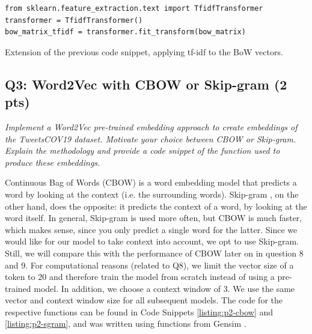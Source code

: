 \begin{listing*}
\begin{verbatim}
from sklearn.feature_extraction.text import TfidfTransformer
transformer = TfidfTransformer()
bow_matrix_tfidf = transformer.fit_transform(bow_matrix)
\end{verbatim}
\caption{Extension of the previous code snippet, applying tf-idf to the BoW vectors.}
\label{listing:p2-tfidf}
\end{listing*}

\subsection*{Q3: Word2Vec with CBOW or Skip-gram (2 pts)}
\textit{Implement a Word2Vec pre-trained embedding approach to create embeddings of the TweetsCOV19 dataset. Motivate your choice between CBOW or Skip-gram. Explain the methodology and provide a code snippet of the function used to produce these embeddings.}

Continuous Bag of Words (CBOW) \cite{cbowsgram} is a word embedding model that predicts a word by looking at the context (i.e. the surrounding words). Skip-gram \cite{cbowsgram}, on the other hand, does the opposite: it predicts the context of a word, by looking at the word itself. In general, Skip-gram is used more often, but CBOW is much faster, which makes sense, since you only predict a single word for the latter. Since we would like for our model to take context into account, we opt to use Skip-gram. Still, we will compare this with the performance of CBOW later on in question 8 and 9. For computational reasons (related to Q8), we limit the vector size of a token to 20 and therefore train the model from scratch instead of using a pre-trained model. In addition, we choose a context window of 3. We use the same vector and context window size for all subsequent models. The code for the respective functions can be found in Code Snippets \ref{listing:p2-cbow} and \ref{listing:p2-sgram}, and was written using functions from Gensim \cite{gensim}.

